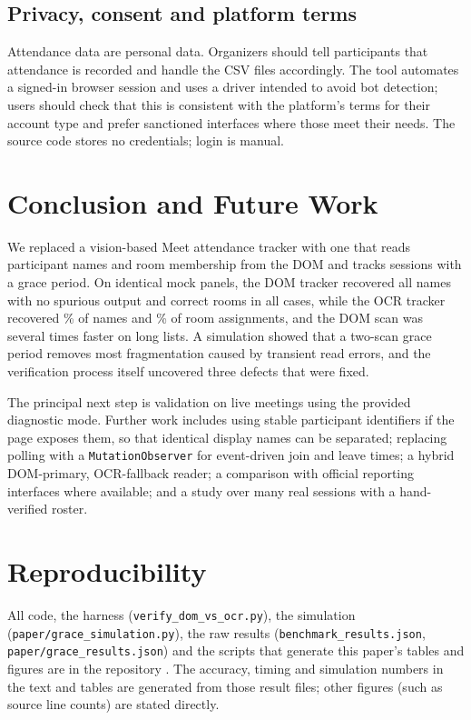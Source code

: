 \documentclass[conference]{IEEEtran}
\begin{document}
\subsection{Privacy, consent and platform terms}
Attendance data are personal data. Organizers should tell participants that attendance is recorded and handle the CSV files accordingly. The tool automates a signed-in browser session and uses a driver intended to avoid bot detection; users should check that this is consistent with the platform's terms for their account type and prefer sanctioned interfaces where those meet their needs. The source code stores no credentials; login is manual.

\section{Conclusion and Future Work}\label{sec:conclusion}
We replaced a vision-based Meet attendance tracker with one that reads participant names and room membership from the DOM and tracks sessions with a grace period. On identical mock panels, the DOM tracker recovered all \nSlots{} names with no spurious output and correct rooms in all \nCases{} cases, while the OCR tracker recovered \ocrRec\% of names and \ocrRoom\% of room assignments, and the DOM scan was several times faster on long lists. A simulation showed that a two-scan grace period removes most fragmentation caused by transient read errors, and the verification process itself uncovered three defects that were fixed.

The principal next step is validation on live meetings using the provided diagnostic mode. Further work includes using stable participant identifiers if the page exposes them, so that identical display names can be separated; replacing polling with a \texttt{MutationObserver} for event-driven join and leave times; a hybrid DOM-primary, OCR-fallback reader; a comparison with official reporting interfaces where available; and a study over many real sessions with a hand-verified roster.

\section*{Reproducibility}
All code, the harness (\texttt{verify\_dom\_vs\_ocr.py}), the simulation (\texttt{paper/grace\_simulation.py}), the raw results (\texttt{benchmark\_results.json}, \texttt{paper/grace\_results.json}) and the scripts that generate this paper's tables and figures are in the repository \cite{repo}. The accuracy, timing and simulation numbers in the text and tables are generated from those result files; other figures (such as source line counts) are stated directly.



\end{document}
